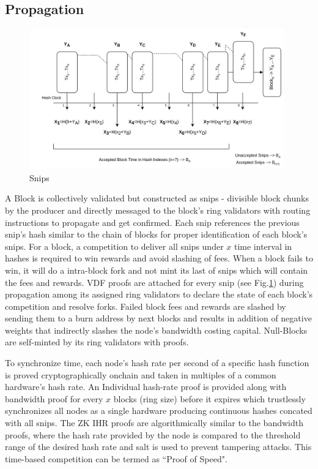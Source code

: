 \documentclass[a4paper,10pt]{article}
\begin{document}
\subsection{Propagation}
\begin{figure}[h]
\begin{center}
\includegraphics[width=11cm]{Snips}
\caption{Snips}
\label{snips}
\end{center}
\end{figure}
A Block is collectively validated but constructed as snips - divisible block chunks by the producer and directly messaged to the block's ring validators with routing instructions to propagate and get confirmed. Each snip references the previous snip's hash similar to the chain of blocks for proper identification of each block's snips. For a block, a competition to deliver all snips under $x$ time interval in hashes is required to win rewards and avoid slashing of fees. When a block fails to win, it will do a intra-block fork and not mint its last of snips which will contain the fees and rewards. VDF proofs are attached for every snip (see Fig.\ref{snips}) during propagation among its assigned ring validators to declare the state of each block's competition and resolve forks. Failed block fees and rewards are slashed by sending them to a burn address by next blocks and results in addition of negative weights that indirectly slashes the node's bandwidth costing capital. Null-Blocks are self-minted by its ring validators with proofs.

To synchronize time, each node's hash rate per second of a specific hash function is proved cryptographically onchain and taken in multiples of a common hardware's hash rate. An Individual hash-rate proof is provided along with bandwidth proof for every $x$ blocks (ring size) before it expires which trustlessly synchronizes all nodes as a single hardware producing continuous hashes concated with all snips. The ZK IHR proofs are algorithmically similar to the bandwidth proofs, where the hash rate provided by the node is compared to the threshold range of the desired hash rate and salt is used to prevent tampering attacks. This time-based competition can be termed as ``Proof of Speed".
\end{document}
